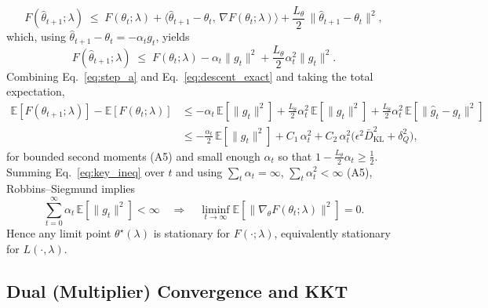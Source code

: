 \documentclass{article} %
\begin{document}
\begin{equation}
\label{eq:taylor2}
F(\widehat{\theta}_{t+1};\lambda)
\;\le\; F(\theta_t;\lambda)
+ \big\langle \widehat{\theta}_{t+1}-\theta_t,\, \nabla F(\theta_t;\lambda) \big\rangle
+ \frac{L_\theta}{2}\,\|\widehat{\theta}_{t+1}-\theta_t\|^2,
\end{equation}
which, using $\widehat{\theta}_{t+1}-\theta_t=-\alpha_t g_t$, yields
\begin{equation}
\label{eq:descent_exact}
F(\widehat{\theta}_{t+1};\lambda)
\;\le\; F(\theta_t;\lambda)
- \alpha_t \|g_t\|^2 + \frac{L_\theta}{2}\alpha_t^2 \|g_t\|^2.
\end{equation}
Combining Eq.~\ref{eq:step_a} and Eq.~\ref{eq:descent_exact} and taking the total expectation,
\begin{align}
\mathbb E\!\left[F(\theta_{t+1};\lambda)\right]-\mathbb E\!\left[F(\theta_t;\lambda)\right]
&\le -\alpha_t\,\mathbb E\!\left[\|g_t\|^2\right]
+ \frac{L_\theta}{2}\alpha_t^2\,\mathbb E\!\left[\|g_t\|^2\right]
+ \frac{L_\theta}{2}\alpha_t^2\,\mathbb E\!\left[\|\widehat{g}_t-g_t\|^2\right] \nonumber\\
&\le -\frac{\alpha_t}{2}\,\mathbb E\!\left[\|g_t\|^2\right]
+ C_1\,\alpha_t^2 + C_2\,\alpha_t^2\Big(\epsilon^2\bar D_{\mathrm{KL}}^2+\delta_Q^2\Big),
\label{eq:key_ineq}
\end{align}
for bounded second moments (A5) and small enough $\alpha_t$ so that $1-\tfrac{L_\theta}{2}\alpha_t\ge \tfrac{1}{2}$. Summing Eq.~\ref{eq:key_ineq} over $t$ and using $\sum_t \alpha_t=\infty$, $\sum_t \alpha_t^2<\infty$ (A5), Robbins–Siegmund implies
\begin{equation}
\sum_{t=0}^{\infty}\alpha_t\,\mathbb E\!\left[\|g_t\|^2\right] < \infty
\quad \Longrightarrow \quad
\liminf_{t\to\infty}\mathbb E\!\left[\|\nabla_\theta F(\theta_t;\lambda)\|^2\right]=0.
\end{equation}
Hence any limit point $\theta^\star(\lambda)$ is stationary for $F(\cdot;\lambda)$, equivalently stationary for $L(\cdot,\lambda)$.

\subsection{Dual (Multiplier) Convergence and KKT}
\label{sec:Multiplier}
\end{document}
